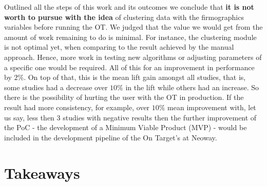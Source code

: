 Outlined all the steps of this work and its outcomes we conclude that \textbf{it is not worth to pursue with the idea} of clustering data with the firmographics variables before running the OT. We judged that the value we would get from the amount of work remaining to do is minimal. For instance, the clustering module is not optimal yet, when comparing to the result achieved by the manual approach. Hence, more work in testing new algorithms or adjusting parameters of a specific one would be required. All of this for an improvement in performance by $2\%$. On top of that, this is the mean lift gain amongst all studies, that is, some studies had a decrease over $10\%$ in the lift while others had an increase. So there is the possibility of hurting the user with the OT in production. If the result had more consistency, for example, over $10\%$ mean improvement with, let us say, less then 3 studies with negative results then the further improvement of the PoC - the development of a Minimum Viable Product (MVP) - would be included in the development pipeline of the On Target's at Neoway. 

\section{Takeaways}

